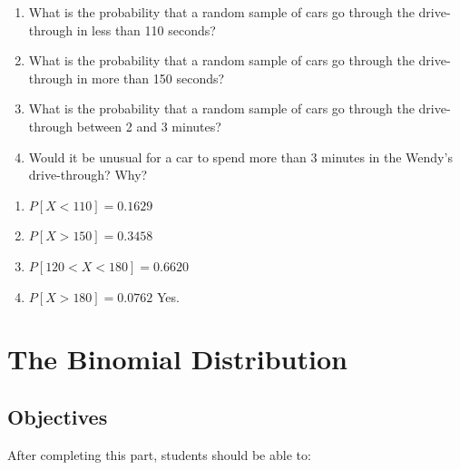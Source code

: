 \documentclass[11pt, chapterprefix=true]{scrbook}\usepackage[]{graphicx}\usepackage[]{color}
\begin{document}
\begin{exercises}
\begin{exercise}
\begin{enumerate}
\item What is the  probability that a random sample of cars go through the drive- \\ through in less than 110 seconds?
\item What is the  probability that a random sample of cars go through the drive- \\ through in more than 150 seconds?
\item What is the  probability that a random sample of cars go through the drive- \\ through between 2 and 3 minutes?
\item Would it be unusual for a car to spend more than 3 minutes in the Wendy's \\ drive-through?  Why?
\end{enumerate}

\end{exercise}
\begin{solution}  %

\begin{enumerate}
\item $P[ X < 110 ] = 0.1629 $
\item $P[ X > 150 ] = 0.3458 $
\item $P[ 120 < X < 180 ] = 0.6620 $
\item $P[ X > 180 ] = 0.0762 $ Yes.
\end{enumerate}

\end{solution}
	

\end{exercises}

 \onecolumn




\chapter{The Binomial Distribution}
\label{chap:ch7}

\section{Objectives}

After completing this part, students should be able to:

\end{document}
